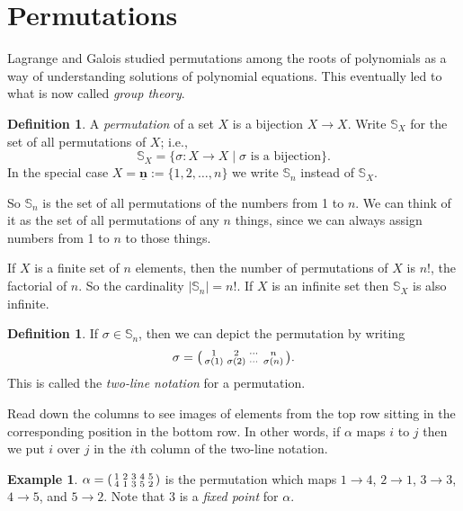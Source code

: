 \documentclass[11pt]{article}
\theoremstyle{definition}
\newtheorem{defn}[thm]{Definition}
\newtheorem{example}[thm]{Example}
\newcommand{\n}{\underline{\mathbf{n}}}
\newcommand{\Sym}{\mathbb{S}}
\newenvironment{perm}[2]{\left(\begin{smallmatrix}#1 \\ #2}{\end{smallmatrix}\right)}
\begin{document}
\setcounter{section}{5}

\section{Permutations}\noindent
Lagrange and Galois studied permutations among the roots of
polynomials as a way of understanding solutions of polynomial
equations.  This eventually led to what is now called \emph{group
  theory}.

\begin{defn}
A {\em permutation} of a set $X$ is a bijection $X \to X$.  Write
$\Sym_X$ for the set of all permutations of $X$; i.e.,
\[ 
\Sym_X = \{ \sigma: X \to X \mid \sigma \text{ is a bijection} \}.
\] 
In the special case $X = \n := \{1, 2, \dots, n \}$ we write $\Sym_n$
instead of $\Sym_X$.
\end{defn}

So $\Sym_n$\index{S@$\Sym_n$} is the set of all permutations of the
numbers from 1 to $n$. We can think of it as the set of all
permutations of any $n$ things, since we can always assign numbers
from 1 to $n$ to those things.

If $X$ is a finite set of $n$ elements, then the number of
permutations of $X$ is $n!$, the factorial of $n$. So the cardinality
$|\Sym_n| = n!$. If $X$ is an infinite set then $\Sym_X$ is also
infinite.



\begin{defn}
  If $\sigma \in \Sym_n$, then we can depict the permutation by
  writing $$\sigma =
  \begin{perm}{1&2&\cdots&n}{\sigma(1)&\sigma(2)&\cdots&\sigma(n)}
  \end{perm}.$$ This is called the 
  \emph{two-line notation} for a permutation.
\end{defn}

Read down the columns to see images of elements from the top row
sitting in the corresponding position in the bottom row. In other
words, if $\alpha$ maps $i$ to $j$ then we put $i$ over
$j$ in the $i$th column of the two-line notation. 

\begin{example}
$\alpha = \begin{perm}{1&2&3&4&5}{4&1&3&5&2} \end{perm}$
is the permutation which maps $1\to 4$, $2\to 1$, $3\to 3$, $4\to 5$,
and $5\to 2$.  Note that $3$ is a {\em fixed point} for $\alpha$. 
\end{example}
\end{document}
